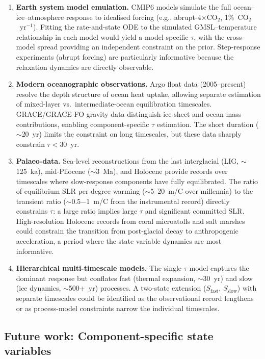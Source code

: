 \documentclass[11pt]{article}
\begin{document}
\begin{enumerate}
  \item \textbf{Earth system model emulation.}  CMIP6 models simulate the full ocean--ice--atmosphere response to idealised forcing (e.g., abrupt-4$\times$CO$_2$, 1\%~CO$_2$~yr$^{-1}$).  Fitting the rate-and-state ODE to the simulated GMSL--temperature relationship in each model would yield a model-specific $\tau$, with the cross-model spread providing an independent constraint on the prior.  Step-response experiments (abrupt forcing) are particularly informative because the relaxation dynamics are directly observable.

  \item \textbf{Modern oceanographic observations.}  Argo float data (2005--present) resolve the depth structure of ocean heat uptake, allowing separate estimation of mixed-layer vs.\ intermediate-ocean equilibration timescales.  GRACE/GRACE-FO gravity data distinguish ice-sheet and ocean-mass contributions, enabling component-specific $\tau$ estimation.  The short duration ($\sim$20~yr) limits the constraint on long timescales, but these data sharply constrain $\tau < 30$~yr.

  \item \textbf{Palaeo-data.}  Sea-level reconstructions from the last interglacial (LIG, $\sim$125~ka), mid-Pliocene ($\sim$3~Ma), and Holocene provide records over timescales where slow-response components have fully equilibrated.  The ratio of equilibrium SLR per degree warming ($\sim$5--20~m/\textdegree C over millennia) to the transient ratio ($\sim$0.5$-$1~m/\textdegree C from the instrumental record) directly constrains $\tau$: a large ratio implies large $\tau$ and significant committed SLR.  High-resolution Holocene records from coral microatolls and salt marshes could constrain the transition from post-glacial decay to anthropogenic acceleration, a period where the state variable dynamics are most informative.

  \item \textbf{Hierarchical multi-timescale models.}  The single-$\tau$ model captures the dominant response but conflates fast (thermal expansion, $\sim$30~yr) and slow (ice dynamics, $\sim$500+~yr) processes.  A two-state extension ($S_{\text{fast}}$, $S_{\text{slow}}$) with separate timescales could be identified as the observational record lengthens or as process-model constraints narrow the individual timescales.
\end{enumerate}


\subsection{Future work: Component-specific state variables}
\end{document}
